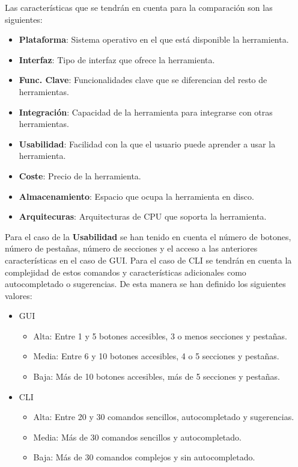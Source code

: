 Las características que se tendrán en cuenta para la comparación son las siguientes:
\begin{itemize}
  \item \textbf{Plataforma}: Sistema operativo en el que está disponible la herramienta.
  \item \textbf{Interfaz}: Tipo de interfaz que ofrece la herramienta.
  \item \textbf{Func. Clave}: Funcionalidades clave que se diferencian del resto de herramientas.
  \item \textbf{Integración}: Capacidad de la herramienta para integrarse con otras herramientas.
  \item \textbf{Usabilidad}: Facilidad con la que el usuario puede aprender a usar la herramienta.
  \item \textbf{Coste}: Precio de la herramienta.
  \item \textbf{Almacenamiento}: Espacio que ocupa la herramienta en disco.
  \item \textbf{Arquitecuras}: Arquitecturas de \gls{CPU} que soporta la herramienta.
\end{itemize}

Para el caso de la \textbf{Usabilidad} se han tenido en cuenta el número de botones, número de pestañas, número de secciones y el acceso a las anteriores características en el caso de \gls{GUI}. Para el caso de \gls{CLI} se tendrán en cuenta la complejidad de estos comandos y características adicionales como autocompletado o sugerencias. De esta manera se han definido los siguientes valores:
\begin{itemize}
    \item \gls{GUI}
        \begin{itemize}
            \item Alta: Entre 1 y 5 botones accesibles, 3 o menos secciones y pestañas.
            \item Media: Entre 6 y 10 botones accesibles, 4 o 5 secciones y pestañas.
            \item Baja: Más de 10 botones accesibles, más de 5 secciones y pestañas.
        \end{itemize}
    \item \gls{CLI}
        \begin{itemize}
            \item Alta: Entre 20 y 30 comandos sencillos, autocompletado y sugerencias.
            \item Media: Más de 30 comandos sencillos y autocompletado.
            \item Baja: Más de 30 comandos complejos y sin autocompletado.
        \end{itemize}
\end{itemize}


